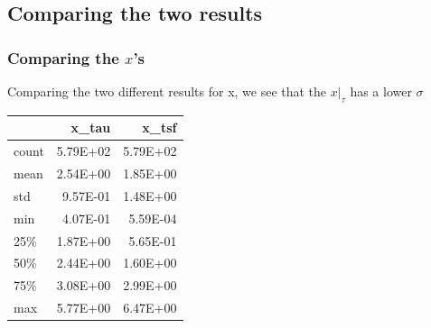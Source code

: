 \documentclass[a4paper,twocolumn]{article}
\begin{document}
\subsection{Comparing the two results}
\label{sec:org88a6937}

\subsubsection{Comparing the \(x\)'s}
\label{sec:org148b753}


Comparing the two different results for x, we see that the \(x|_\tau\) has a lower \(\sigma\)

\begin{table}[hc]
\centering
\begin{tabular}{lrr}
\toprule
{} &    x\_tau &    x\_tsf \\
\midrule
count & 5.79E+02 & 5.79E+02 \\
mean  & 2.54E+00 & 1.85E+00 \\
std   & 9.57E-01 & 1.48E+00 \\
min   & 4.07E-01 & 5.59E-04 \\
25\%   & 1.87E+00 & 5.65E-01 \\
50\%   & 2.44E+00 & 1.60E+00 \\
75\%   & 3.08E+00 & 2.99E+00 \\
max   & 5.77E+00 & 6.47E+00 \\
\bottomrule
\end{tabular}
\end{table}
\end{document}

